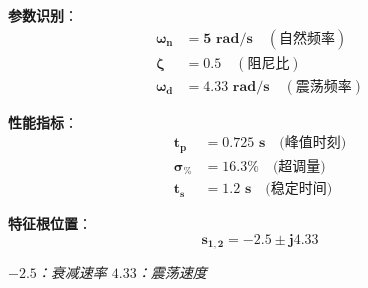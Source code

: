 \begin{tcolorbox}[colback=green!5!white,colframe=green!75!black,title=具体例：欠阻尼二阶系统 $G(s) = \dfrac{25}{s^2+5s+25}$,boxsep=3pt,left=3pt,right=3pt,top=3pt,bottom=3pt]
\begin{minipage}[b]{0.39\textwidth}
\textbf{参数识别}：
\begin{align*}
\boldsymbol{\omega_n} &\mathbf{= 5 \text{ rad/s}} \quad (\text{自然频率}) \\
\boldsymbol{\zeta} &\mathbf{= 0.5} \quad (\text{阻尼比}) \\
\boldsymbol{\omega_d} &\mathbf{= 4.33 \text{ rad/s}} \quad (\text{震荡频率})
\end{align*}

\textbf{性能指标}：
\begin{align*}
\mathbf{t_p} &\mathbf{= 0.725 \text{ s}} \quad \text{(峰值时刻)} \\
\mathbf{\sigma_\%} &\mathbf{= 16.3\%} \quad \text{(超调量)} \\
\mathbf{t_s} &\mathbf{= 1.2 \text{ s}} \quad \text{(稳定时间)}
\end{align*}

\textbf{特征根位置}：
$$\mathbf{s_{1,2} = -2.5 \pm j4.33}$$
\vspace{0.2cm}

{\small \textit{$-2.5$：衰减速率  \quad $4.33$：震荡速度}}

\end{minipage}

\end{tcolorbox}